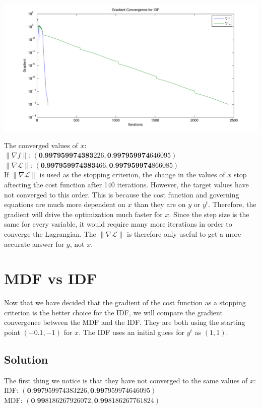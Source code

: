 \documentclass[letterpaper,12pt]{article}
\begin{document}
\begin{center}
\includegraphics[scale=0.6]{GradCompa}
\label{stopcomp}
\end{center}

The converged values of $x$: \\
$\|\nabla f\| $: $(\textbf{0.997959974383}226, \textbf{0.997959974}646095)$ \\
$\|\nabla \mathcal{L}\| $: $(\textbf{0.997959974383}466,\textbf{0.997959974}866085)$\\

If $\|\nabla \mathcal{L}\|$ is used as the stopping criterion, the change in the values of $x$ stop aftecting the cost function after 140 iterations. However, the target values have not converged to this order. This is because the cost function and governing equations are much more dependent on $x$ than they are on $y$ or $y^t$. Therefore, the gradient will drive the optimization much faster for $x$. Since the step size is the same for every variable, it would require many more iterations in order to converge the Lagrangian. The $\|\nabla \mathcal{L}\|$ is therefore only useful to get a more accurate answer for $y$, not $x$.\\

\section{MDF vs IDF}

Now that we have decided that the gradient of the cost function as a stopping criterion is the better choice for the IDF, we will compare the gradient convergence between the MDF and the IDF. They are both using the starting point $(-0.1,-1)$ for $x$. The IDF uses an initial guess for $y^t$ as $(1,1)$.\\
\newpage
\subsection{Solution}
The first thing we notice is that they have not converged to the same values of $x$:\\
IDF: $(\textbf{0.99}7959974383226, \textbf{0.99}7959974646095)$ \\
MDF: $(\textbf{0.99}8186267926072, \textbf{0.99}8186267761824)$\\
\end{document}
